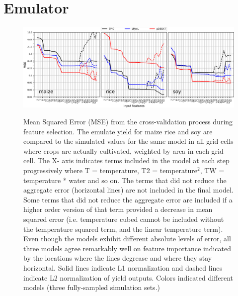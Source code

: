 \documentclass[10pt]{article}
\begin{document}
\section{Emulator}
\begin{figure}[h!]
\includegraphics[width=\textwidth]{s_feature_selection.png}\\
\caption{Mean Squared Error (MSE) from the cross-validation process during feature selection. The emulate yield for maize rice and soy are compared to the simulated values for the same model in all grid cells where crops are actually cultivated, weighted by area in each grid cell. The X- axis indicates terms included in the model at each step progressively where T = temperature, T2 = temperature$^{2}$, TW  = temperature * water and so on. The terms that did not reduce the aggregate error (horizontal lines) are not included in the final model. Some terms that did not reduce the aggregate error are included if a higher order version of that term provided a decrease in mean squared error (i.e. temperature cubed cannot be included without the temperature squared term, and the linear temperature term). Even though the models exhibit different absolute levels of error, all three models agree remarkably well on feature importance indicated by the locations where the lines degrease and where they stay horizontal. Solid lines indicate L1 normalization and dashed lines indicate L2 normalization of yield outputs. Colors indicated different models (three fully-sampled simulation sets.)}
\label{fig:featureselection}
\end{figure}

\clearpage
\end{document}

